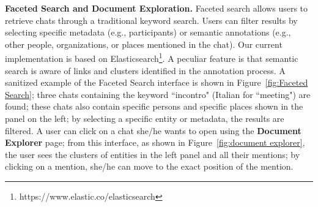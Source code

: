 \textbf{Faceted Search and Document Exploration.}
Faceted search allows users to retrieve chats through a traditional keyword search. Users can filter results by selecting specific metadata (e.g., participants) or semantic annotations (e.g., other people, organizations, or places mentioned in the chat). Our current implementation is based on Elasticsearch\footnote{https://www.elastic.co/elasticsearch}. A peculiar feature is that semantic search is aware of links and clusters identified in the annotation process. 
A sanitized example of the Faceted Search interface is shown in Figure~\ref{fig:Faceted Search}; three chats containing the keyword ``incontro" (Italian for ``meeting") are found; these chats also contain specific persons and specific places shown in the panel on the left; by selecting a specific entity or metadata, the results are filtered. A user can click on a chat she/he wants to open using the \textbf{Document Explorer} page; from this interface, as shown in Figure~\ref{fig:document explorer}, the user sees the clusters of entities in the left panel and all their mentions; by clicking on a mention, she/he can move to the exact position of the mention. %




